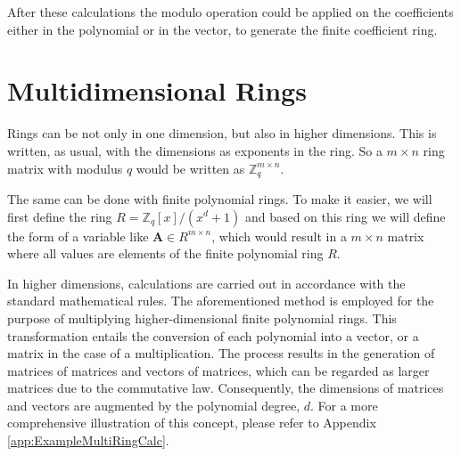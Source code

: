After these calculations the modulo operation could be applied on the coefficients either in the polynomial or in the vector, to generate the finite coefficient ring.

\section{Multidimensional Rings}

Rings can be not only in one dimension, but also in higher dimensions. This is written, as usual, with the dimensions as exponents in the ring. So a $m \times n$ ring matrix with modulus $q$ would be written as $\mathbb{Z}^{m\times n}_q$.

The same can be done with finite polynomial rings. To make it easier, we will first define the ring $R = \mathbb{Z}_q[x]/(x^d+1)$ and based on this ring we will define the form of a variable like $\textbf{A} \in R^{m\times n}$, which would result in a $m \times n$ matrix where all values are elements of the finite polynomial ring $R$.

In higher dimensions, calculations are carried out in accordance with the standard mathematical rules. The aforementioned method is employed for the purpose of multiplying higher-dimensional finite polynomial rings. This transformation entails the conversion of each polynomial into a vector, or a matrix in the case of a multiplication. The process results in the generation of matrices of matrices and vectors of matrices, which can be regarded as larger matrices due to the commutative law. Consequently, the dimensions of matrices and vectors are augmented by the polynomial degree, $d$. For a more comprehensive illustration of this concept, please refer to Appendix \ref{app:ExampleMultiRingCalc}.